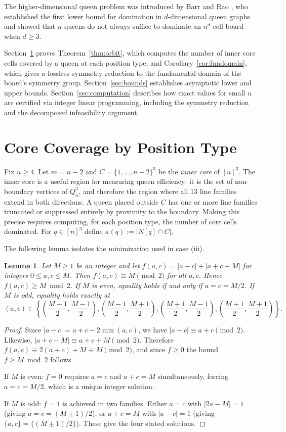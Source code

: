 \documentclass[11pt]{article}
\newtheorem{lemma}[theorem]{Lemma}
\begin{document}
The higher-dimensional queen problem was introduced by Barr and Rao
\cite{barrrao2007}, who established the first lower bound for domination in
$d$-dimensional queen graphs and showed that $n$ queens do not always suffice to
dominate an $n^d$-cell board when $d \geq 3$.

Section~\ref{sec:main} proves Theorem~\ref{thm:orbit}, which computes the
number of inner core cells covered by a queen at each position type, and
Corollary~\ref{cor:fundomain}, which gives a lossless symmetry reduction to the
fundamental domain of the board's symmetry group. Section~\ref{sec:bounds}
establishes asymptotic lower and upper bounds. Section~\ref{sec:computation}
describes how exact values for small $n$ are certified via integer linear
programming, including the symmetry reduction and the decomposed infeasibility
argument.

\section{Core Coverage by Position Type}
\label{sec:main}

Fix $n \geq 4$. Let $m = n-2$ and $C = \{1,\ldots,n-2\}^3$ be the
\emph{inner core} of $[n]^3$. The inner core is a useful region for measuring
queen efficiency: it is the set of non-boundary vertices of $Q^3_n$, and therefore
the region where all 13 line families extend in both directions.
A queen placed outside $C$ has one or more line families truncated or suppressed
entirely by proximity to the boundary. Making this precise requires computing,
for each position type, the number of core cells dominated. For $q \in[n]^3$
define $\kappa(q) := |N[q] \cap C|$.

The following lemma isolates the minimization used in case (iii).

\begin{lemma}
\label{lem:parity}
Let $M \geq 1$ be an integer and let $f(a,c) = |a-c| + |a+c-M|$ for integers
$0 \leq a, c \leq M$. Then $f(a,c) \equiv M \pmod{2}$ for all $a, c$. Hence
$f(a,c) \geq M \bmod 2$. If $M$ is even, equality holds if and only if
$a = c = M/2$. If $M$ is odd, equality holds exactly at
\[
(a,c) \in \left\{\left(\frac{M-1}{2},\frac{M-1}{2}\right),
\left(\frac{M-1}{2},\frac{M+1}{2}\right),
\left(\frac{M+1}{2},\frac{M-1}{2}\right),
\left(\frac{M+1}{2},\frac{M+1}{2}\right)\right\}.
\]
\end{lemma}

\begin{proof}
Since $|a-c| = a+c-2\min(a,c)$, we have $|a-c| \equiv a+c \pmod{2}$. Likewise,
$|a+c-M| \equiv a+c+M \pmod{2}$. Therefore
$f(a,c) \equiv 2(a+c)+M \equiv M \pmod{2}$, and since $f \geq 0$ the bound
$f \geq M \bmod 2$ follows.

If $M$ is even: $f = 0$ requires $a = c$ and $a+c = M$ simultaneously, forcing
$a = c = M/2$, which is a unique integer solution.

If $M$ is odd: $f = 1$ is achieved in two families. Either $a = c$ with
$|2a-M| = 1$ (giving $a = c = (M \pm 1)/2$), or $a+c = M$ with $|a-c| = 1$
(giving $\{a,c\} = \{(M \pm 1)/2\}$). These give the four stated solutions.
\end{proof}
\end{document}
